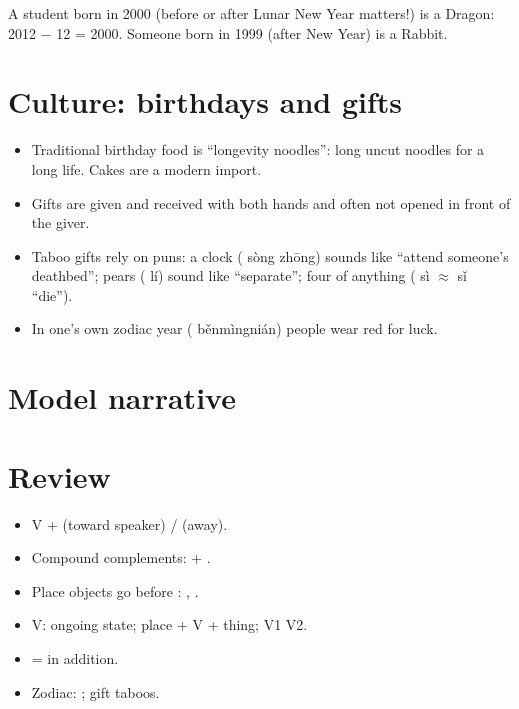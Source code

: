 \begin{example}
A student born in 2000 (before or after Lunar New Year matters!) is a Dragon:
2012 $-$ 12 = 2000. Someone born in 1999 (after New Year)
is a Rabbit.
\end{example}

\section{Culture: birthdays and gifts}

\begin{aside}
\begin{itemize}
  \item Traditional birthday food is  ``longevity noodles'': long uncut
        noodles for a long life. Cakes are a modern import.
  \item Gifts are given and received with both hands and often not opened in front of
        the giver.
  \item Taboo gifts rely on puns: a clock ( sòng zhōng) sounds like
         ``attend someone's deathbed''; pears ( lí) sound like
         ``separate''; four of anything ( sì $\approx$  sǐ ``die'').
  \item In one's own zodiac year ( běnmìngnián) people wear red for luck.
\end{itemize}
\end{aside}

\section{Model narrative}


\section*{Review}
\begin{itemize}
  \item V +  (toward speaker) /  (away).
  \item Compound complements:  + .
  \item Place objects go before : , .
  \item V: ongoing state; place + V + thing; V1 V2.
  \item {} = in addition.
  \item Zodiac: ; gift taboos.
\end{itemize}
